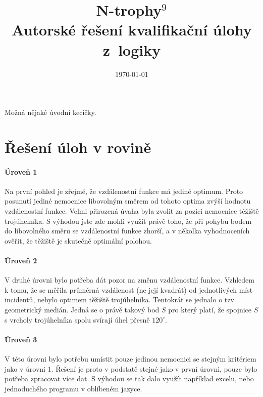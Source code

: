 \documentclass[12pt,a4paper]{article}
\begin{document}
\pagestyle{fancy}     %
\setcounter{page}{1}  %

\fancyhead[R]{}

\title{N-trophy$^9$\\Autorské řešení kvalifikační úlohy z~logiky}
\date{\today}
\maketitle

Možná nějaké úvodní kecičky.

\section*{Řešení úloh v rovině}
\paragraph*{Úroveň 1}
Na první pohled je zřejmé, že vzdálenostní funkce má jediné optimum. Proto posunutí jediné nemocnice libovolným směrem od tohoto optima zvýší hodnotu vzdálenostní funkce.
Velmi přirozená úvaha byla zvolit za pozici nemocnice těžiště trojúhelníka. S výhodou jste zde mohli využít právě toho, že při pohybu bodem do libovolného směru se vzdálenostní funkce zhorší, a v několka vyhodnoceních ověřit, že těžiště je skutečně optimální polohou.
\paragraph*{Úroveň 2}
V druhé úrovni bylo potřeba dát pozor na změnu vzdálenostní funkce. Vzhledem k tomu, že se měřila průměrná vzdálenost (ne její kvadrát) od jednotlivých míst incidentů,
nebylo optimem těžiště trojúhelníka. Tentokrát se jednalo o tzv. geometrický medián. Jedná se o právě takový bod $S$ pro který platí, že spojnice $S$ s vrcholy trojúhelníka spolu svírají úhel přesně $120^\circ$.
\paragraph*{Úroveň 3}
V této úrovni bylo potřebu umístit pouze jedinou nemocnici se stejným kritériem jako v úrovni 1. Řešení je proto v podstatě stejné jako v první úrovni, pouze bylo potřeba zpracovat více dat. S výhodou se tak dalo využít například excelu, nebo jednoduchého programu v oblíbeném jazyce.
\end{document}
